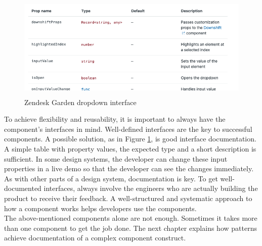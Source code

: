 \begin{figure}[hbtp]
	\centerline{\includegraphics[height=5cm]{images/zendesk_component_interface.png}}
	\caption{Zendesk Garden dropdown interface \cite{zendesk_garden_zendesk_nodate}}
	\label{zen_garden_interface}
\end{figure}
To achieve flexibility and reusability, it is important to always have the component's interfaces in mind. Well-defined interfaces are the key to successful components. A possible solution, as in Figure \ref{zen_garden_interface}, is good interface documentation. A simple table with property values, the expected type and a short description is sufficient. In some design systems, the developer can change these input properties in a live demo so that the developer can see the changes immediately.\\
As with other parts of a design system, documentation is key. To get well-documented interfaces, always involve the engineers who are actually building the product to receive their feedback.  A well-structured and systematic approach to how a component works helps developers use the components.  \cite{vesselov_building_2019}\\
The above-mentioned components alone are not enough. Sometimes it takes more than one component to get the job done. The next chapter explains how patterns achieve documentation of a complex component construct. 

